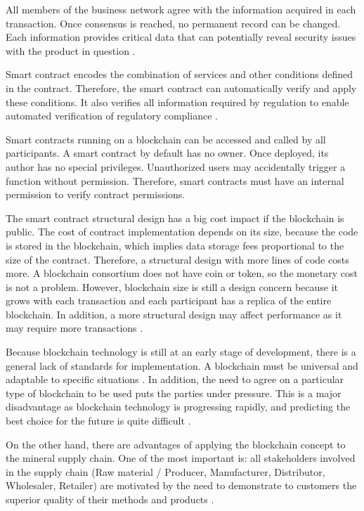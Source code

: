 All members of the business network agree with the information acquired in each transaction. Once consensus is reached, no permanent record can be changed. Each information provides critical data that can potentially reveal security issues with the product in question \cite{galvez2018future}.

Smart contract encodes the combination of services and other conditions defined in the contract. Therefore, the smart contract can automatically verify and apply these conditions. It also verifies all information required by regulation to enable automated verification of regulatory compliance \cite{lu2017adaptable}. 

Smart contracts running on a blockchain can be accessed and called by all participants. A smart contract by default has no owner. Once deployed, its author has no special privileges. Unauthorized users may accidentally trigger a function without permission. Therefore, smart contracts must have an internal permission to verify contract permissions.

The smart contract structural design has a big cost impact if the blockchain is public. The cost of contract implementation depends on its size, because the code is stored in the blockchain, which implies data storage fees proportional to the size of the contract. Therefore, a structural design with more lines of code costs more. A blockchain consortium does not have coin or token, so the monetary cost is not a problem. However, blockchain size is still a design concern because it grows with each transaction and each participant has a replica of the entire blockchain. In addition, a more structural design may affect performance as it may require more transactions \cite{lu2017adaptable}.

Because blockchain technology is still at an early stage of development, there is a general lack of standards for implementation. A blockchain must be universal and adaptable to specific situations \cite{valenta2017comparison}. In addition, the need to agree on a particular type of blockchain to be used puts the parties under pressure. This is a major disadvantage as blockchain technology is progressing rapidly, and predicting the best choice for the future is quite difficult \cite{galvez2018future}.

On the other hand, there are advantages of applying the blockchain concept to the mineral supply chain. One of the most important is: all stakeholders involved in the supply chain (Raw material / Producer, Manufacturer, Distributor, Wholesaler, Retailer) are motivated by the need to demonstrate to customers the superior quality of their methods and products \cite{lu2017adaptable}. 

